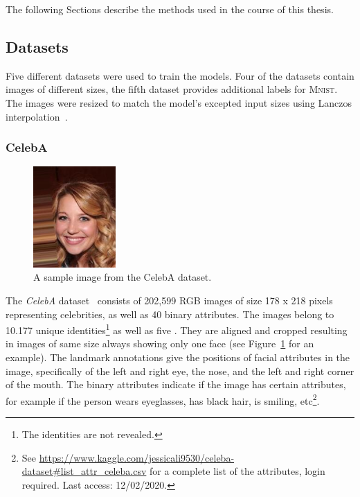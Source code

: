 The following Sections describe the methods used in the course of this thesis.

\subsection{Datasets}\label{subsec:datasets}

Five different datasets were used to train the models.
Four of the datasets contain images of different sizes, the fifth dataset provides additional labels for \textsc{Mnist}.
The images were resized to match the model's excepted input sizes using Lanczos interpolation~\citep[pp. 223, ff]{burger2009principles}.

\subsubsection{CelebA}

\begin{figure}
    \begin{center}
        \includegraphics[width=0.28\textwidth]{images/celeba_sample_63.jpg}
    \end{center}
    \caption[CelebA dataset sample image]{A sample image from the CelebA dataset.}
    \label{fig:celeba_sample}
\end{figure}

The \textit{CelebA} dataset~\citep{liu2015faceattributes} consists of 202,599 RGB images of size 178 x 218 pixels representing celebrities, as well as 40 binary attributes.
The images belong to 10.177 unique identities\footnote{The identities are not revealed.} as well as five .
They are aligned and cropped resulting in images of same size always showing only one face (see Figure~\ref{fig:celeba_sample} for an example).
The landmark annotations give the positions of facial attributes in the image, specifically of the left and right eye, the nose, and the left and right corner of the mouth.
The binary attributes indicate if the image has certain attributes, for example if the person wears eyeglasses, has black hair, is smiling, etc\footnote{See \href{https://www.kaggle.com/jessicali9530/celeba-dataset\#list\_attr\_celeba.csv}{https://www.kaggle.com/jessicali9530/celeba-dataset\#list\_attr\_celeba.csv} for a complete list of the attributes, login required. Last access: 12/02/2020.}.

